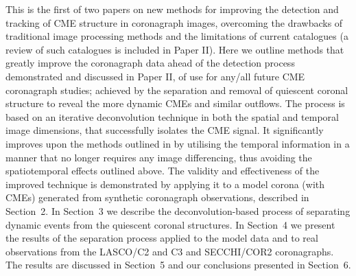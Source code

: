 \documentclass[namedreferences]{SolarPhysics}
\begin{document}
\begin{article}
This is the first of two papers on new methods for improving the detection and tracking of CME structure in coronagraph images, overcoming the drawbacks of traditional image processing methods and the limitations of current catalogues (a review of such catalogues is included in Paper II). Here we outline methods that greatly improve the coronagraph data ahead of the detection process demonstrated and discussed in Paper II, of use for any/all future CME coronagraph studies; achieved by the separation and removal of quiescent coronal structure to reveal the more dynamic CMEs and similar outflows. The process is based on an iterative deconvolution technique in both the spatial and temporal image dimensions, that successfully isolates the CME signal. It significantly improves upon the methods outlined in \citet{2010ApJ...711..631M} by utilising the temporal information in a manner that no longer requires any image differencing, thus avoiding the spatiotemporal effects outlined above. The validity and effectiveness of the improved technique is demonstrated by applying it to a model corona (with CMEs) generated from synthetic coronagraph observations, described in Section~2. In Section~3 we describe the deconvolution-based process of separating dynamic events from the quiescent coronal structures. In Section~4 we present the results of the separation process applied to the model data and to real observations from the LASCO/C2 and C3 and SECCHI/COR2 coronagraphs. The results are discussed in Section~5 and our conclusions presented in Section~6.



%
%
 
   
%
%
%   
%  

\end{article} 
\end{document}
